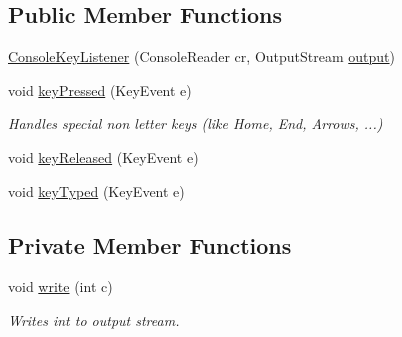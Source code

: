 \subsection*{Public Member Functions}
\begin{DoxyCompactItemize}
\item 
\hyperlink{classgov_1_1nasa_1_1jpf_1_1inspector_1_1frontends_1_1jpfshell_1_1gui_1_1_swing_terminal_1_1_console_key_listener_a7968fda050df7f7d58308208338de042}{Console\+Key\+Listener} (Console\+Reader cr, Output\+Stream \hyperlink{classgov_1_1nasa_1_1jpf_1_1inspector_1_1frontends_1_1jpfshell_1_1gui_1_1_swing_terminal_1_1_console_key_listener_a3544ea414f2d2dbfde66aa97dda16dac}{output})
\item 
void \hyperlink{classgov_1_1nasa_1_1jpf_1_1inspector_1_1frontends_1_1jpfshell_1_1gui_1_1_swing_terminal_1_1_console_key_listener_a807bfc887f007b034fde6c8b65ddf5a9}{key\+Pressed} (Key\+Event e)
\begin{DoxyCompactList}\small\item\em Handles special non letter keys (like Home, End, Arrows, ...) \end{DoxyCompactList}\item 
void \hyperlink{classgov_1_1nasa_1_1jpf_1_1inspector_1_1frontends_1_1jpfshell_1_1gui_1_1_swing_terminal_1_1_console_key_listener_afdc5124c06f4e251bb6130192ab79321}{key\+Released} (Key\+Event e)
\item 
void \hyperlink{classgov_1_1nasa_1_1jpf_1_1inspector_1_1frontends_1_1jpfshell_1_1gui_1_1_swing_terminal_1_1_console_key_listener_af7a1db3c97600c6e9cd93348d0fc4ba7}{key\+Typed} (Key\+Event e)
\end{DoxyCompactItemize}
\subsection*{Private Member Functions}
\begin{DoxyCompactItemize}
\item 
void \hyperlink{classgov_1_1nasa_1_1jpf_1_1inspector_1_1frontends_1_1jpfshell_1_1gui_1_1_swing_terminal_1_1_console_key_listener_a4bfaacb6e4d69ffdc03aec846ebda4da}{write} (int c)
\begin{DoxyCompactList}\small\item\em Writes int to output stream. \end{DoxyCompactList}\end{DoxyCompactItemize}
